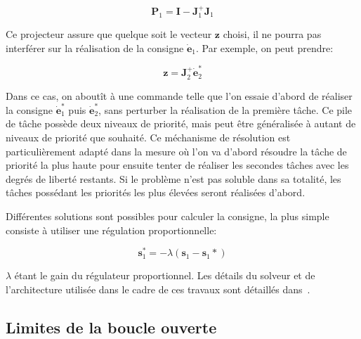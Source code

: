 \begin{equation}
  \mathbf{P}_1 = \mathbf{I} - \mathbf{J}_1^{+} \mathbf{J}_1
\end{equation}

Ce projecteur assure que quelque soit le vecteur $\mathbf{z}$ choisi,
il ne pourra pas interférer sur la réalisation de la consigne
$\dot{\mathbf{e}}_1$. Par exemple, on peut prendre:

\begin{equation}
  \mathbf{z} = \mathbf{J}_2^{+} \dot{\mathbf{e}}_2^{*}
\end{equation}

Dans ce cas, on aboutît à une commande telle que l'on essaie d'abord
de réaliser la consigne $\dot{\mathbf{e}}_1^{*}$ puis
$\dot{\mathbf{e}}_2^{*}$, sans perturber la réalisation de la première
tâche. Ce pile de tâche possède deux niveaux de priorité, mais peut
être généralisée à autant de niveaux de priorité que souhaité. Ce
méchanisme de résolution est particulièrement adapté dans la mesure où
l'on va d'abord résoudre la tâche de priorité la plus haute pour
ensuite tenter de réaliser les secondes tâches avec les degrés de
liberté restants. Si le problème n'est pas soluble dans sa totalité,
les tâches possédant les priorités les plus élevées seront réalisées
d'abord.


Différentes solutions sont possibles pour calculer la consigne, la
plus simple consiste à utiliser une régulation proportionnelle:

\begin{equation}
  \mathbf{s}_1^{*} = -\lambda (\mathbf{s}_1 - \mathbf{s}_1{*})
\end{equation}

$\lambda$ étant le gain du régulateur proportionnel. Les détails du
solveur et de l'architecture utilisée dans le cadre de ces travaux
sont détaillés dans~\cite{09icar.mansard}.


\subsection{Limites de la boucle ouverte}


